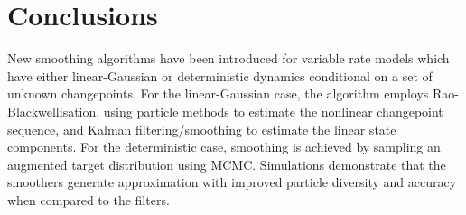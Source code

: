 \documentclass[journal]{IEEEtran}
\begin{document}
\section{Conclusions}

New smoothing algorithms have been introduced for variable rate models which have either linear-Gaussian or deterministic dynamics conditional on a set of unknown changepoints. For the linear-Gaussian case, the algorithm employs Rao-Blackwellisation, using particle methods to estimate the nonlinear changepoint sequence, and Kalman filtering/smoothing to estimate the linear state components. For the deterministic case, smoothing is achieved by sampling an augmented target distribution using MCMC. Simulations demonstrate that the smoothers generate approximation with improved particle diversity and accuracy when compared to the filters.



%
%
%






\end{document}
